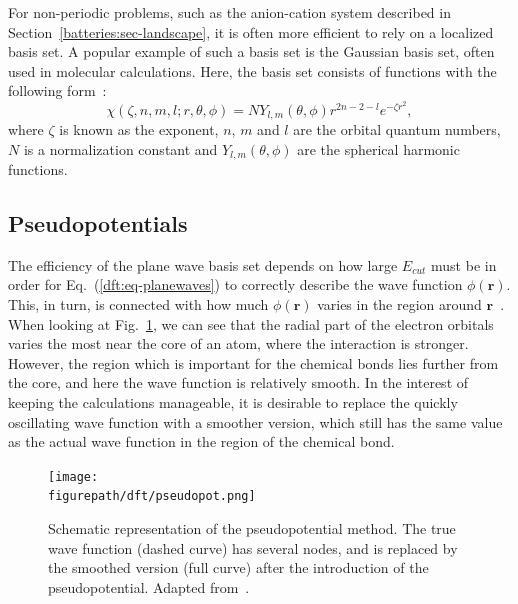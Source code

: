 \begin{refsection}
 \label{dft:sec-gaussian}
For non-periodic problems, such as the anion-cation system described in Section~\ref{batteries:sec-landscape}, it is often more efficient to rely on a localized basis set. A popular example of such a basis set is the Gaussian basis set, often used in molecular calculations. Here, the basis set consists of functions with the following form~\cite{Hill2013}: 
\begin{equation}
\chi(\zeta, n, m, l; r, \theta, \phi) = N Y_{l,m}(\theta, \phi) r^{2n-2-l} e^{-\zeta r^2},
\end{equation}
where $\zeta$ is known as the exponent, $n$, $m$ and $l$ are the orbital quantum numbers, $N$ is a normalization constant and $Y_{l,m}(\theta, \phi)$ are the spherical harmonic functions. 
 
\subsection{Pseudopotentials} 
 
The efficiency of the plane wave basis set depends on 
how large $E_{cut}$ must be in order for Eq.~(\ref{dft:eq-planewaves}) to correctly describe the wave function $\phi (\mathbf{r})$. 
This, in turn, is connected with how much $\phi (\mathbf{r})$ varies in the 
region around $\mathbf{r}$~\cite{Kohanoff2006}. When looking at 
Fig.~\ref{dft:fig-pseudo}, we can see that the radial part of the electron 
orbitals varies the most near the core of an atom, where the interaction is 
stronger. However, the region which is important for the chemical bonds lies 
further from the core, and here the wave function is relatively smooth. In the 
interest of keeping the calculations manageable, it is desirable to replace 
the quickly oscillating wave function with a smoother version, which still has 
the same value as the actual wave function in the region of the chemical bond. 
 
\begin{figure}[ht]  
\captionsetup{width=0.8\textwidth} 
\centering 
\texttt{[image: \\figurepath/dft/pseudopot.png]} 
\caption{\label{dft:fig-pseudo} Schematic representation of the pseudopotential 
method. The true wave function (dashed curve) has several nodes, and is 
replaced by the smoothed version (full curve) after the introduction of the 
pseudopotential. Adapted from~\cite{Singh2006}.} 
\end{figure} 
 

\end{refsection}
